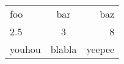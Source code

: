 \begin{tabular}{|l|c|r|}
    foo & bar & baz \\
    2.5 & 3 & 8 \\
    youhou & blabla & yeepee
\end{tabular}
